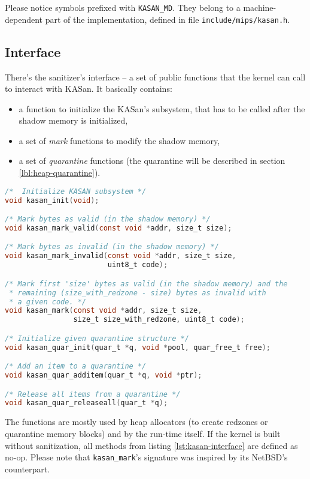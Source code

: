 \documentclass[shortabstract, manyadvisors, english, mgr]{iithesis}
\theoremstyle{definition} \newtheorem*{definition}{Definicja}
\theoremstyle{definition} \newtheorem*{example}{Przykład}
\theoremstyle{definition} \newtheorem*{remark}{Uwaga}
\begin{document}
Please notice symbols prefixed with \texttt{KASAN\_MD}. They belong to a machine-dependent part of the implementation, defined in file \texttt{include/mips/kasan.h}.

\subsection{Interface}
There's the sanitizer's interface -- a set of public functions that the kernel can call to interact with KASan. It basically contains:
\begin{itemize}
    \item a function to initialize the KASan's subsystem, that has to be called after the shadow memory is initialized,
    \item a set of \textit{mark} functions to modify the shadow memory,
    \item a set of \textit{quarantine} functions (the quarantine will be described in section \ref{lbl:heap-quarantine}).
\end{itemize}

\begin{lstlisting}[language=C, caption={The KASan's interface, a fragment of \texttt{include/sys/kasan.h} file.}, label={lst:kasan-interface}]
/*  Initialize KASAN subsystem */
void kasan_init(void);

/* Mark bytes as valid (in the shadow memory) */
void kasan_mark_valid(const void *addr, size_t size);

/* Mark bytes as invalid (in the shadow memory) */
void kasan_mark_invalid(const void *addr, size_t size,
                        uint8_t code);

/* Mark first 'size' bytes as valid (in the shadow memory) and the
 * remaining (size_with_redzone - size) bytes as invalid with
 * a given code. */
void kasan_mark(const void *addr, size_t size,
                size_t size_with_redzone, uint8_t code);

/* Initialize given quarantine structure */
void kasan_quar_init(quar_t *q, void *pool, quar_free_t free);

/* Add an item to a quarantine */
void kasan_quar_additem(quar_t *q, void *ptr);

/* Release all items from a quarantine */
void kasan_quar_releaseall(quar_t *q);
\end{lstlisting}

The functions are mostly used by heap allocators (to create redzones or quarantine memory blocks) and by the run-time itself. If the kernel is built without sanitization, all methods from listing \ref{lst:kasan-interface} are defined as no-op.
Please note that \texttt{kasan\_mark}'s signature was inspired by its NetBSD's counterpart.
\end{document}
